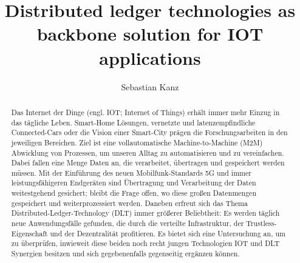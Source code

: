 \documentclass[
    ngerman,american
    ]{scrartcl}
\title{
        Distributed ledger technologies as backbone solution for IOT applications
        \\  \Large{\paperSubTitle{\lang}}} %
\author{
        Sebastian Kanz
        }
\begin{document}
      \maketitle
        \begin{abstract}
            Das Internet der Dinge (engl. IOT; Internet of Things) erhält immer mehr Einzug in das tägliche Leben. Smart-Home Lösungen, vernetzte und latenzempfindliche Connected-Cars oder die Vision einer Smart-City prägen die Forschungsarbeiten in den jeweiligen Bereichen. Ziel ist eine vollautomatische Machine-to-Machine (M2M) Abwicklung von Prozessen, um unseren Alltag zu automatisieren und zu vereinfachen. Dabei fallen eine Menge Daten an, die verarbeitet, übertragen und gespeichert werden müssen. Mit der Einführung des neuen Mobilfunk-Standards 5G und immer leistungsfähigeren Endgeräten sind Übertragung und Verarbeitung der Daten weitestgehend gesichert; bleibt die Frage offen, wo diese großen Datenmengen gespeichert und weiterprozessiert werden.
            Daneben erfreut sich das Thema Distributed-Ledger-Technology (DLT) immer größerer Beliebtheit: Es werden täglich neue Anwendungsfälle gefunden, die durch die verteilte Infrastruktur, der Trustless-Eigenschaft und der Dezentralität profitieren. Es bietet sich eine Untersuchung an, um zu überprüfen, inwieweit diese beiden noch recht jungen Technologien IOT und DLT Synergien besitzen und sich gegebenenfalls gegenseitig ergänzen können.

\end{abstract}
\end{document}
